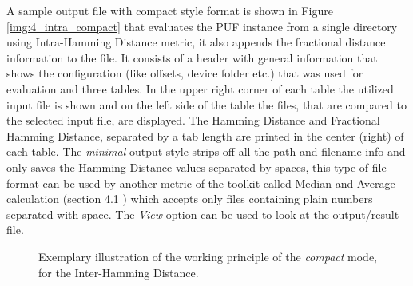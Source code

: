 A sample output file with compact style format is shown in Figure \ref{img:4_intra_compact} that evaluates the PUF instance from a single directory using Intra-Hamming Distance metric, it also appends the fractional distance information to the file. It consists of a header with general information that shows the configuration (like offsets, device folder etc.) that was used for evaluation and three tables. In the upper right corner of each table the utilized input file is shown and on the left side of the table
the files, that are compared to the selected input file, are displayed. The Hamming Distance and Fractional Hamming Distance, separated by a tab length are printed in the center (right) of each table. The
\emph{minimal} output style strips off all the path and filename info and only saves the Hamming Distance values separated by spaces, this type of file format can be used by another metric of the toolkit called Median and Average calculation (section 4.1 \cite{71}) which accepts only files containing plain numbers separated with space. The \emph{View} option can be used to look at the output/result file.\\


\begin{figure}
\centering
{}
\caption{Exemplary illustration of the working principle of the \emph{compact} mode, for the Inter-Hamming Distance.}
\label{img:inter_compact}
\end{figure}

